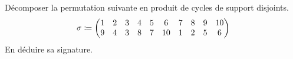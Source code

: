 \documentclass{magnolia}
\begin{document}


Décomposer la permutation suivante en produit de cycles de support
disjoints.
$$\sigma\coloneqq
\begin{pmatrix}
1&2&3&4&5&6&7&8&9&10\\
9&4&3&8&7&10&1&2&5&6 
\end{pmatrix}
$$
En déduire sa signature.
\end{document}
